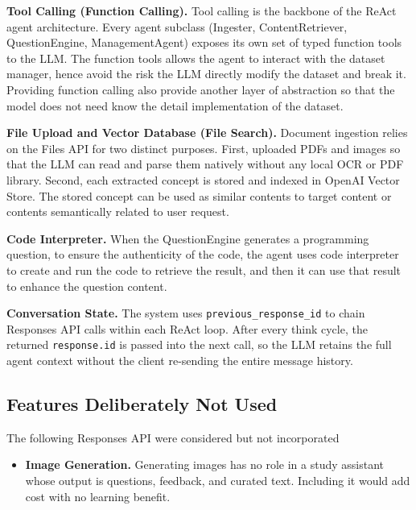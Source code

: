 \documentclass[12pt,a4paper]{article}
\begin{document}
\textbf{Tool Calling (Function Calling).}
Tool calling is the backbone of the ReAct agent architecture. Every agent subclass (Ingester, ContentRetriever, QuestionEngine, ManagementAgent) exposes its own set of typed function tools to the LLM. The function tools allows the agent to interact with the dataset manager, hence avoid the risk the LLM directly modify the dataset and break it. Providing function calling also provide another layer of abstraction so that the model does not need know the detail implementation of the dataset.

\textbf{File Upload and Vector Database (File Search).}
Document ingestion relies on the Files API for two distinct purposes. First, uploaded PDFs and images so that the LLM can read and parse them natively without any local OCR or PDF library. Second, each extracted concept is stored and indexed in OpenAI Vector Store. The stored concept can be used as similar contents to target content or contents semantically related to user request.

\textbf{Code Interpreter.}
When the QuestionEngine generates a programming question, to ensure the authenticity of the code, the agent uses code interpreter to create and run the code to retrieve the result, and then it can use that result to enhance the question content.

\textbf{Conversation State.}
The system uses \texttt{previous\_response\_id} to chain Responses API calls within each ReAct loop. After every think cycle, the returned \texttt{response.id} is passed into the next call, so the LLM retains the full agent context without the client re-sending the entire message history.

\subsection{Features Deliberately Not Used}

The following Responses API were considered but not incorporated

\begin{itemize}[leftmargin=*]

  \item \textbf{Image Generation.}
  Generating images has no role in a study assistant whose output is questions, feedback, and curated text. Including it would add cost with no learning benefit.


\end{itemize}

\end{document}
